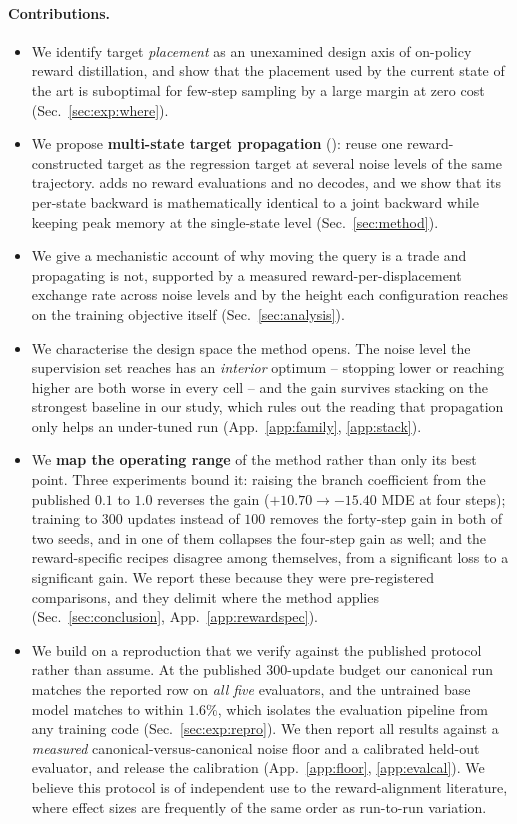 \paragraph{Contributions.}
\begin{itemize}[leftmargin=1.4em,itemsep=2pt]
\item We identify target \emph{placement} as an unexamined design axis of on-policy reward
distillation, and show that the placement used by the current state of the art is
suboptimal for few-step sampling by a large margin at zero cost (Sec.~\ref{sec:exp:where}).
\item We propose \textbf{multi-state target propagation} (\MSP): reuse one reward-constructed
target as the regression target at several noise levels of the same trajectory. \MSP adds
no reward evaluations and no decodes, and we show that its per-state backward is
mathematically identical to a joint backward while keeping peak memory at the
single-state level (Sec.~\ref{sec:method}).
\item We give a mechanistic account of why moving the query is a trade and propagating is
not, supported by a measured reward-per-displacement exchange rate across noise levels and
by the height each configuration reaches on the training objective itself
(Sec.~\ref{sec:analysis}).
\item We characterise the design space the method opens. The noise level the supervision
set reaches has an \emph{interior} optimum -- stopping lower or reaching higher are both
worse in every cell -- and the gain survives stacking on the strongest baseline in our
study, which rules out the reading that propagation only helps an under-tuned run
(App.~\ref{app:family}, \ref{app:stack}).
\item We \textbf{map the operating range} of the method rather than only its best point.
Three experiments bound it: raising the branch coefficient from the published $0.1$ to
$1.0$ reverses the gain ($+10.70\to-15.40$ MDE at four steps); training to $300$ updates
instead of $100$ removes the forty-step gain in both of two seeds, and in one of them
collapses the four-step gain as well; and the
reward-specific recipes disagree among themselves, from a significant loss to a significant
gain. We report these because they were
pre-registered comparisons, and they delimit where the method applies
(Sec.~\ref{sec:conclusion}, App.~\ref{app:rewardspec}).
\item We build on a reproduction that we verify against the published protocol rather than
assume. At the published $300$-update budget our canonical run matches the reported row on
\emph{all five} evaluators, and the untrained base model matches to within $1.6\%$, which
isolates the evaluation pipeline from any training code
(Sec.~\ref{sec:exp:repro}). We then report all results against a \emph{measured}
canonical-versus-canonical noise floor and a calibrated held-out evaluator, and release the
calibration (App.~\ref{app:floor}, \ref{app:evalcal}). We believe this protocol is of independent use
to the reward-alignment literature, where effect sizes are frequently of the same order as
run-to-run variation.
\end{itemize}
